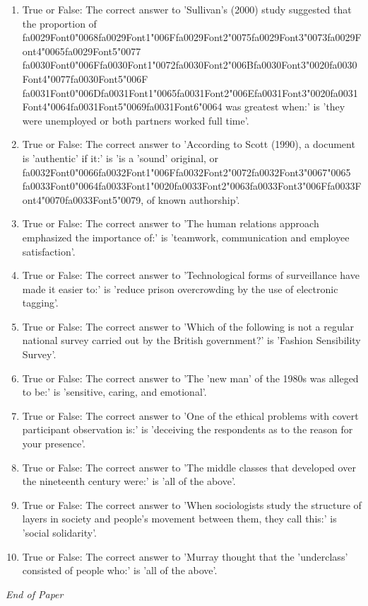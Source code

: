 \documentclass[12pt]{article}
\begin{document}
\begin{enumerate}[label=\arabic*.]
\item True or False: The correct answer to 'Sullivan's (2000) study suggested that the proportion of {\csname fa0029Font0\endcsname\char"0068}{\csname fa0029Font1\endcsname\char"006F}{\csname fa0029Font2\endcsname\char"0075}{\csname fa0029Font3\endcsname\char"0073}{\csname fa0029Font4\endcsname\char"0065}{\csname fa0029Font5\endcsname\char"0077} {\csname fa0030Font0\endcsname\char"006F}{\csname fa0030Font1\endcsname\char"0072}{\csname fa0030Font2\endcsname\char"006B}{\csname fa0030Font3\endcsname\char"0020}{\csname fa0030Font4\endcsname\char"0077}{\csname fa0030Font5\endcsname\char"006F} {\csname fa0031Font0\endcsname\char"006D}{\csname fa0031Font1\endcsname\char"0065}{\csname fa0031Font2\endcsname\char"006E}{\csname fa0031Font3\endcsname\char"0020}{\csname fa0031Font4\endcsname\char"0064}{\csname fa0031Font5\endcsname\char"0069}{\csname fa0031Font6\endcsname\char"0064} was greatest when:' is 'they were unemployed or both partners worked full time'.
\item True or False: The correct answer to 'According to Scott (1990), a document is 'authentic' if it:' is 'is a 'sound' original, or {\csname fa0032Font0\endcsname\char"0066}{\csname fa0032Font1\endcsname\char"006F}{\csname fa0032Font2\endcsname\char"0072}{\csname fa0032Font3\endcsname\char"0067}{\char"0065} {\csname fa0033Font0\endcsname\char"0064}{\csname fa0033Font1\endcsname\char"0020}{\csname fa0033Font2\endcsname\char"0063}{\csname fa0033Font3\endcsname\char"006F}{\csname fa0033Font4\endcsname\char"0070}{\csname fa0033Font5\endcsname\char"0079}, of known authorship'.
\item True or False: The correct answer to 'The human relations approach emphasized the importance of:' is 'teamwork, communication and employee satisfaction'.
\item True or False: The correct answer to 'Technological forms of surveillance have made it easier to:' is 'reduce prison overcrowding by the use of electronic tagging'.
\item True or False: The correct answer to 'Which of the following is not a regular national survey carried out by the British government?' is 'Fashion Sensibility Survey'.
\item True or False: The correct answer to 'The 'new man' of the 1980s was alleged to be:' is 'sensitive, caring, and emotional'.
\item True or False: The correct answer to 'One of the ethical problems with covert participant observation is:' is 'deceiving the respondents as to the reason for your presence'.
\item True or False: The correct answer to 'The middle classes that developed over the nineteenth century were:' is 'all of the above'.
\item True or False: The correct answer to 'When sociologists study the structure of layers in society and people's movement between them, they call this:' is 'social solidarity'.
\item True or False: The correct answer to 'Murray thought that the 'underclass' consisted of people who:' is 'all of the above'.
\end{enumerate}

\vfill
\noindent\textit{End of Paper}
\end{document}
